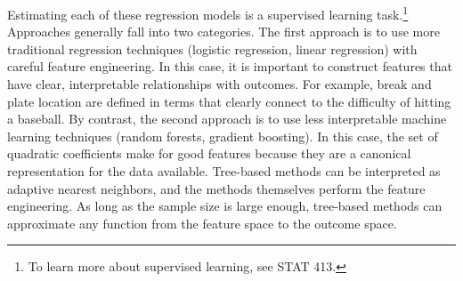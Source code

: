 \documentclass{article}
\begin{document}
    Estimating each of these regression models is a supervised learning task.\footnote{To learn more about supervised learning, see STAT 413.} Approaches generally fall into two categories. The first approach is to use more traditional regression techniques (logistic regression, linear regression) with careful feature engineering. In this case, it is important to construct features that have clear, interpretable relationships with outcomes. For example, break and plate location are defined in terms that clearly connect to the difficulty of hitting a baseball. By contrast, the second approach is to use less interpretable machine learning techniques (random forests, gradient boosting). In this case, the set of quadratic coefficients make for good features because they are a canonical representation for the data available. Tree-based methods can be interpreted as adaptive nearest neighbors, and the methods themselves perform the feature engineering. As long as the sample size is large enough, tree-based methods can approximate any function from the feature space to the outcome space.
\end{document}
